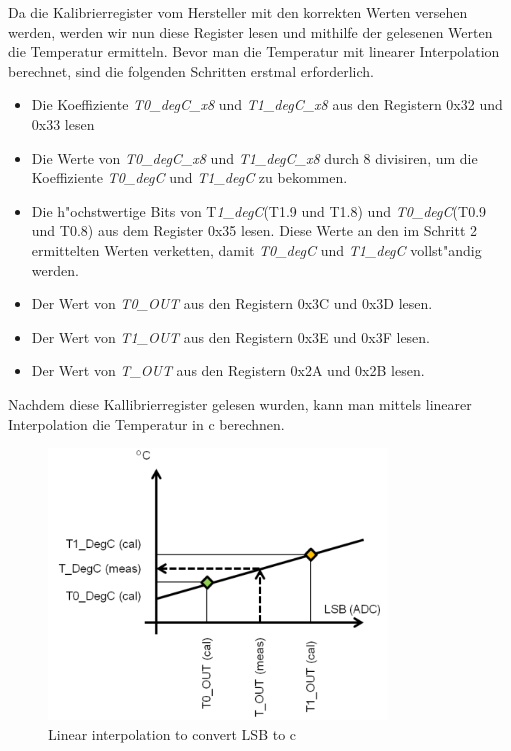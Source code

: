 Da die Kalibrierregister vom Hersteller mit den korrekten Werten 
versehen werden, werden wir nun diese Register lesen und mithilfe der 
gelesenen Werten die Temperatur ermitteln. Bevor man die Temperatur mit 
linearer Interpolation berechnet, sind die folgenden Schritten erstmal 
erforderlich.

\begin{itemize}
	\item Die Koeffiziente \textit{T0\_degC\_x8} und 
	\textit{T1\_degC\_x8} aus den Registern 0x32 und 0x33 lesen
	\item Die Werte von \textit{T0\_degC\_x8} und \textit{T1\_degC\_x8} 
	durch 8 divisiren, um die Koeffiziente \textit{T0\_degC} und 
	\textit{T1\_degC} zu bekommen.
	\item Die h"ochstwertige Bits von T\textit{1\_degC}(T1.9 und T1.8) 
	und \textit{T0\_degC}(T0.9 und T0.8) aus dem Register 0x35 lesen. 
	Diese Werte an den im Schritt 2 ermittelten Werten verketten, damit 
	\textit{T0\_degC} und \textit{T1\_degC} vollst"andig werden.
	\item Der Wert von \textit{T0\_OUT} aus den Registern 0x3C und 0x3D 
	lesen.
	\item Der Wert von \textit{T1\_OUT} aus den Registern 0x3E und 0x3F 
	lesen.
	\item Der Wert von \textit{T\_OUT} aus den Registern 0x2A und 0x2B 
	lesen.
	 	
\end{itemize}

Nachdem diese Kallibrierregister gelesen wurden, kann man mittels 
linearer Interpolation die Temperatur in \textdegree{}c berechnen.

\begin{figure}[h]
	\centering
	\includegraphics[width=9cm]{source/images/Temp}
	\caption{Linear interpolation to convert LSB to \textdegree{}c 
	\cite{HTS221}}\label{fig:T}
\end{figure}

